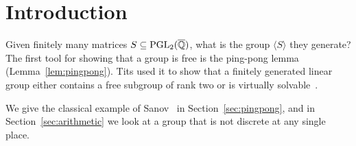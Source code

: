 \section{Introduction}\label{sec:intro}

Given finitely many matrices $S \subseteq \mathrm{PGL}_2(\overline{\mathbb{Q}})$, what is the
group $\langle S \rangle$ they generate? The first tool for showing that a group
is free is the ping-pong lemma (Lemma~\ref{lem:pingpong}). Tits used it to show
that a finitely generated linear group either contains a free subgroup of rank
two or is virtually solvable~\cite{tits}.

We give the classical example of Sanov~\cite{sanov} in
Section~\ref{sec:pingpong}, and in Section~\ref{sec:arithmetic} we look at a
group that is not discrete at any single place.
